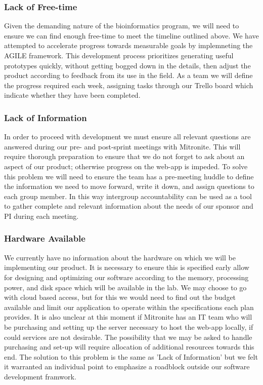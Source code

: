 \documentclass[10pt,twocolumn,letterpaper]{article}
\begin{document}

            \subsubsection{Lack of Free-time}
                    Given the demanding nature of the bioinformatics program, we will need to ensure we can find enough free-time to meet the timeline outlined above. We have attempted to accelerate progress towards measurable goals by implemneting the AGILE framework. This development process prioritizes generating useful prototypes quickly, without getting bogged down in the details, then adjust the product according to feedback from its use in the field. As a team we will define the progress required each week, assigning tasks through our Trello board which indicate whether they have been completed.
                
            \subsubsection{Lack of Information}
                    In order to proceed with development we must ensure all relevant questions are answered during our pre- and post-sprint meetings with Mitronite. This will require thorough preparation to ensure that we do not forget to ask about an aspect of our product; otherwise progress on the web-app is impeded. To solve this problem we will need to ensure the team has a pre-meeting huddle to define the information we need to move forward, write it down, and assign questions to each group member. In this way intergroup accountability can be used as a tool to gather complete and relevant information about the needs of our sponsor and PI during each meeting.
            \subsubsection{Hardware Available}
                     We currently have no information about the hardware on which we will be implementing our product. It is necessary to ensure this is specified early allow for designing and optimizing our software according to the memory, processing power, and disk space which will be available in the lab. We may choose to go with cloud based access, but for this we would need to find out the budget available and limit our application to operate within the specifications each plan provides. It is also unclear at this moment if Mitronite has an IT team who will be purchasing and setting up the server necessary to host the web-app locally, if could services are not desirable. The possibility that we may be asked to handle purchasing and set-up will require allocation of additional resources towards this end. The solution to this problem is the same as 'Lack of Information' but we felt it warranted an individual point to emphasize a roadblock outside our software development framwork.
\end{document}

